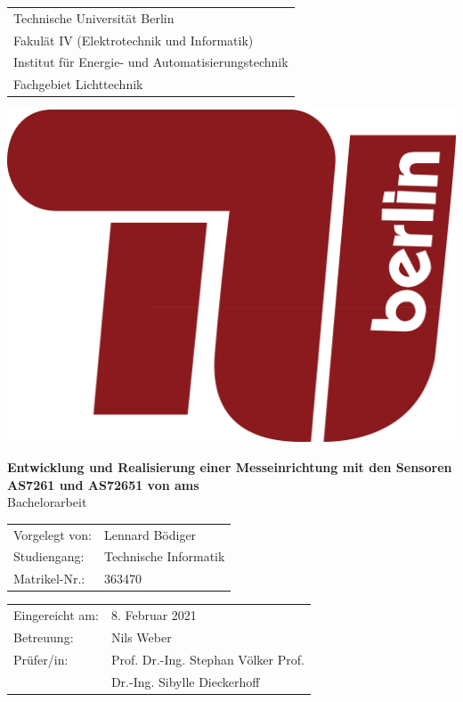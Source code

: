 \documentclass[a4paper,oneside,12pt,titlepage]{scrartcl}   %
\begin{document}

\begin{titlepage}
\begin{center}
	\begin{minipage}{0.6\textwidth}
	\begin{tabular}{l}
	Technische Universität Berlin\\
	Fakulät IV (Elektrotechnik und Informatik)\\
	Institut für Energie- und Automatisierungstechnik\\
	Fachgebiet Lichttechnik\\
	\end{tabular}
	\end{minipage}
	\hfill
	\begin{minipage}{0.3\textwidth}\raggedright
	\includegraphics[scale=0.06]{tu-logo}\\
	\end{minipage}
	
	\vspace{3cm}
    \sffamily \LARGE \textbf{Entwicklung und Realisierung einer Messeinrichtung mit den Sensoren AS7261 und AS72651 von ams}\\
 	\Large Bachelorarbeit\\
    \vspace{2.5cm}
	{\renewcommand{\arraystretch}{0.7}
    	\begin{tabular}{ll}
    		Vorgelegt von: & Lennard Bödiger\\
			Studiengang:	 & Technische Informatik\\
			Matrikel-Nr.: & 363470\\
		\end{tabular}
	}

  	\vspace{5.5cm}
	\end{center}
	\begin{tabular}{ll}
		Eingereicht am: & 8. Februar 2021\\
		Betreuung: & Nils Weber\\
		Prüfer/in: & Prof. Dr.-Ing. Stephan Völker Prof.\\ 	& Dr.-Ing. Sibylle Dieckerhoff
	\end{tabular}\\
\end{titlepage}
\end{document}
